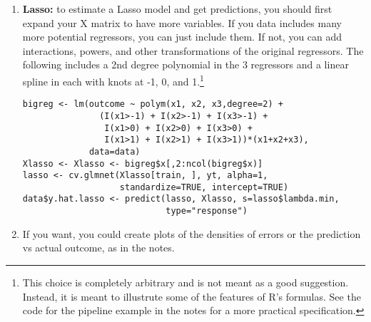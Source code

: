 \begin{problem}
\begin{enumerate}
  \item \textbf{Lasso:} to estimate a Lasso model and get predictions,
    you should first expand your X matrix to have more variables. If
    you data includes many more potential regressors, you can just
    include them. If not, you can add interactions, powers, and other
    transformations of the original regressors. The following includes
    a 2nd degree polynomial in the 3 regressors and a linear spline in
    each with knots at -1, 0, and 1.\footnote{This choice is completely
    arbitrary and is not meant as a good suggestion. Instead, it is
    meant to illustrute some of the features of R's formulas. See the
    code for the pipeline example in the notes for a more practical
    specification.} 
\begin{lstlisting}
bigreg <- lm(outcome ~ polym(x1, x2, x3,degree=2) +
               (I(x1>-1) + I(x2>-1) + I(x3>-1) +
                I(x1>0) + I(x2>0) + I(x3>0) +
                I(x1>1) + I(x2>1) + I(x3>1))*(x1+x2+x3),
             data=data)
Xlasso <- Xlasso <- bigreg$x[,2:ncol(bigreg$x)]
lasso <- cv.glmnet(Xlasso[train, ], yt, alpha=1,
                   standardize=TRUE, intercept=TRUE)
data$y.hat.lasso <- predict(lasso, Xlasso, s=lasso$lambda.min,
                            type="response")
\end{lstlisting}

  \item If you want, you could create plots of the densities of errors
    or the prediction vs actual outcome, as in the notes. 
  \end{enumerate}
\end{problem}






